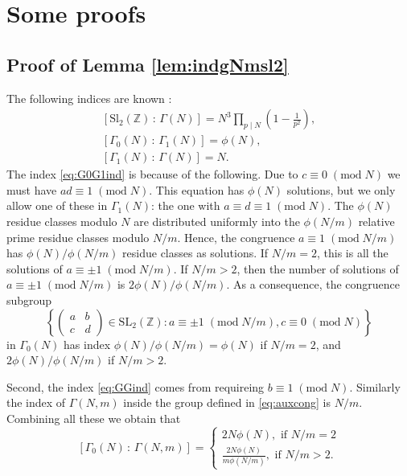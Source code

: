 \documentclass[11pt,a4paper]{amsart}
\theoremstyle{definition}
\newcommand{\SZ}{\mathbb{Z}}                    %
\begin{document}
\appendix
\section{Some proofs}
\subsection{Proof of Lemma \ref{lem:indgNmsl2}}
\label{sec:app0}

The following indices are known \cite[Section 1.2]{diamond2005first}:
\begin{gather}
\label{eq:GGind} [\mathrm{Sl}_2(\SZ) \, : \, \Gamma(N)] = N^3 \prod_{p \mid N}\left(1-\frac{1}{p^2} \right), \\
\label{eq:G0G1ind} [\Gamma_0(N) \, : \, \Gamma_1(N) ]= \phi(N), \\
\label{eq:GGind} [\Gamma_1(N) \, : \, \Gamma(N) ]= N.
\end{gather}
The index \eqref{eq:G0G1ind} is because of the following. Due to $c \equiv 0 \;( \mathrm{mod}\;N)$ we must have $ad\equiv 1 \;( \mathrm{mod}\;N)$. This equation has $\phi(N)$ solutions, but we only allow one of these in $\Gamma_1(N)$: the one with $a\equiv d\equiv 1 \;(\mathrm{mod}\;N)$. The $\phi(N)$ residue classes modulo $N$ are distributed uniformly into the $\phi(N/m)$ relative prime residue classes modulo $N/m$. Hence, the congruence $a \equiv 1 \;( \mathrm{mod}\;N/m)$ has $\phi(N)/\phi(N/m)$ residue classes as solutions. If $N/m=2$, this is all the solutions of $a \equiv \pm 1 \;( \mathrm{mod}\;N/m)$. If $N/m>2$, then the number of solutions of $a \equiv \pm 1 \;( \mathrm{mod}\;N/m)$ is $2\phi(N)/\phi(N/m)$. As a consequence, the congruence subgroup
\begin{equation}  \left\{ \begin{pmatrix} a & b \\ c & d \end{pmatrix} \in \mathrm{SL}_2(\SZ): a \equiv \pm 1 \;(\mathrm{mod}\;N/m), c \equiv 0 \;(\mathrm{mod}\;N) \right\} 
\label{eq:auxcong}
\end{equation}
in $\Gamma_0(N)$ has index $\phi(N)/\phi(N/m)=\phi(N)$ if $N/m=2$, and $2\phi(N)/\phi(N/m)$ if $N/m>2$.

Second, the index \eqref{eq:GGind} comes from requireing $b \equiv 1 \;( \mathrm{mod}\;N)$. Similarly the index of $\Gamma(N,m)$ inside the group defined in \eqref{eq:auxcong} is $N/m$. Combining all these we obtain that 
\[ [\Gamma_0(N) \, : \, \Gamma(N,m) ]= \begin{cases}
2N \phi(N), \textrm{ if } N/m =2 \\
\frac{2N \phi(N)}{m \phi(N/m)}, \textrm{ if } N/m >2.
\end{cases} \]
\end{document}
